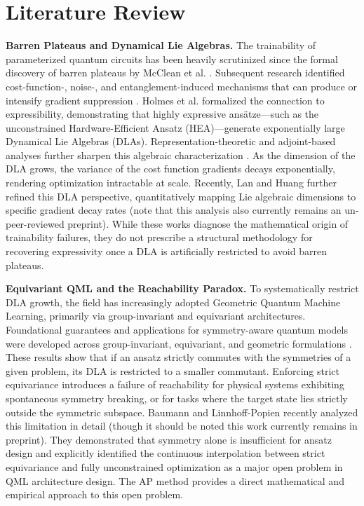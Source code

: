 \documentclass[10pt,twocolumn]{article}
\theoremstyle{remark}
\begin{document}
\section{Literature Review}

\textbf{Barren Plateaus and Dynamical Lie Algebras.} The trainability of parameterized quantum circuits has been heavily scrutinized since the formal discovery of barren plateaus by McClean et al. \cite{mcclean2018barren}. Subsequent research identified cost-function-, noise-, and entanglement-induced mechanisms that can produce or intensify gradient suppression \cite{cerezo2021cost,wang2021noise,ortiz2021entanglement}. Holmes et al. \cite{holmes2022connecting} formalized the connection to expressibility, demonstrating that highly expressive ans\"atze—such as the unconstrained Hardware-Efficient Ansatz (HEA)—generate exponentially large Dynamical Lie Algebras (DLAs). Representation-theoretic and adjoint-based analyses further sharpen this algebraic characterization \cite{fontana2023adjoint,ragone2023representation}. As the dimension of the DLA grows, the variance of the cost function gradients decays exponentially, rendering optimization intractable at scale. Recently, Lan and Huang \cite{lan2026dla} further refined this DLA perspective, quantitatively mapping Lie algebraic dimensions to specific gradient decay rates (note that this analysis also currently remains an un-peer-reviewed preprint). While these works diagnose the mathematical origin of trainability failures, they do not prescribe a structural methodology for recovering expressivity once a DLA is artificially restricted to avoid barren plateaus.

\textbf{Equivariant QML and the Reachability Paradox.} To systematically restrict DLA growth, the field has increasingly adopted Geometric Quantum Machine Learning, primarily via group-invariant and equivariant architectures. Foundational guarantees and applications for symmetry-aware quantum models were developed across group-invariant, equivariant, and geometric formulations \cite{larocca2022group,nguyen2024theory,meyer2023exploiting,skolik2023equivariant,schatzki2022theoretical}. These results show that if an ansatz strictly commutes with the symmetries of a given problem, its DLA is restricted to a smaller commutant. Enforcing strict equivariance introduces a failure of reachability for physical systems exhibiting spontaneous symmetry breaking, or for tasks where the target state lies strictly outside the symmetric subspace. Baumann and Linnhoff-Popien \cite{baumann2026exploiting} recently analyzed this limitation in detail (though it should be noted this work currently remains in preprint). They demonstrated that symmetry alone is insufficient for ansatz design and explicitly identified the continuous interpolation between strict equivariance and fully unconstrained optimization as a major open problem in QML architecture design. The AP method provides a direct mathematical and empirical approach to this open problem.
\end{document}
